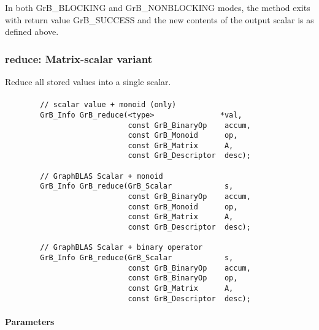 In both {\sf GrB\_BLOCKING} and {\sf GrB\_NONBLOCKING} modes, the method exits with return value 
{\sf GrB\_SUCCESS} and the new contents of the output scalar is as defined above.



\subsubsection{{\sf reduce}: Matrix-scalar variant}
\label{Sec:Reduce_matrix_scalar}

Reduce all stored values into a single scalar.

\paragraph{\syntax}

\begin{verbatim}
        // scalar value + monoid (only)
        GrB_Info GrB_reduce(<type>               *val,
                            const GrB_BinaryOp    accum,
                            const GrB_Monoid      op,
                            const GrB_Matrix      A,
                            const GrB_Descriptor  desc);

        // GraphBLAS Scalar + monoid
        GrB_Info GrB_reduce(GrB_Scalar            s,
                            const GrB_BinaryOp    accum,
                            const GrB_Monoid      op,
                            const GrB_Matrix      A,
                            const GrB_Descriptor  desc);

        // GraphBLAS Scalar + binary operator
        GrB_Info GrB_reduce(GrB_Scalar            s,
                            const GrB_BinaryOp    accum,
                            const GrB_BinaryOp    op,
                            const GrB_Matrix      A,
                            const GrB_Descriptor  desc);
\end{verbatim}

\paragraph{Parameters}

